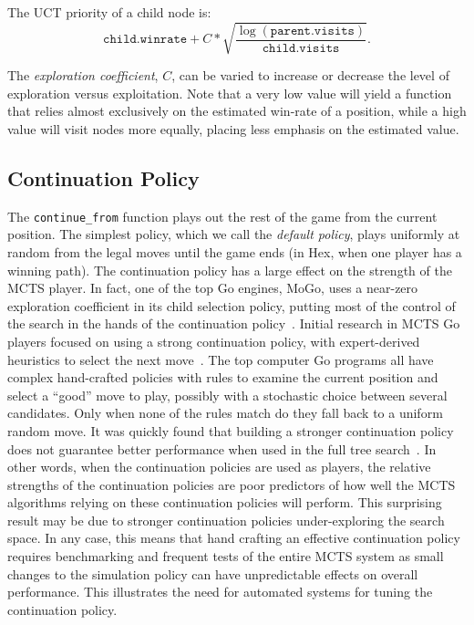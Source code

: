 \documentclass{acm_proc_article-sp}
\begin{document}
The UCT priority of a child node is:
\[
	\texttt{child.winrate} + C*\sqrt{\frac{\log{(\texttt{parent.visits})}}{\texttt{child.visits}}}.
\]

The \emph{exploration coefficient}, $C$, can be varied to increase or decrease the level of exploration versus exploitation. Note that a very low value will yield a function that relies almost exclusively on the estimated win-rate of a position, while a high value will visit nodes more equally, placing less emphasis on the estimated value.

\subsection{Continuation Policy}

The \verb+continue_from+ function plays out the rest of the game from the current position. 
The simplest policy, which we call the \emph{default policy},
 plays uniformly at random from the legal moves until the game ends (in Hex, when one player has a winning path). 
The continuation policy has a large effect on the strength of the MCTS player.
In fact, one of the top Go engines, MoGo, uses a near-zero exploration coefficient in its child selection policy,
putting most of the control of the search in the hands of the continuation policy~\cite{gelly2007combining}.
Initial research in MCTS Go players focused on using a strong continuation policy, with expert-derived heuristics to select the next move~\cite{chaslot2010adding}. 
The top computer Go programs all have complex hand-crafted policies with rules to examine the current position and select a ``good'' move to play, possibly with a stochastic choice between several candidates. 
Only when none of the rules match do they fall back to a uniform random move. 
It was quickly found that building a stronger continuation policy does not guarantee better performance when used in the full tree search~\cite{gelly2006modification}. 
In other words, when the continuation policies are used as players, the relative strengths of the continuation policies are poor predictors
of how well the MCTS algorithms relying on these continuation policies will perform.
This surprising result may be due to stronger continuation policies under-exploring the search space.
In any case, this means that hand crafting an effective continuation policy requires benchmarking and frequent tests of the entire
MCTS system as small changes to the simulation policy can have unpredictable effects on overall performance.
This illustrates the need for automated systems for tuning the continuation policy.
\end{document}
